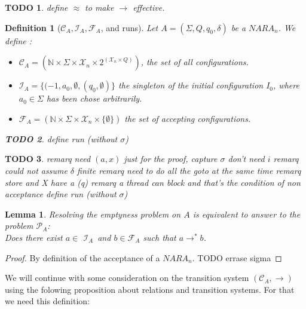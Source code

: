 \documentclass[a4paper,10pt]{report}
\newtheorem{lm}{Lemma}[thr]
\newtheorem{df}{Definition}
\newtheorem{td}{TODO}
\newcommand{\C}{\mathcal{C}_{A}}
\newcommand{\I}{\mathcal{I}_{A}}
\newcommand{\F}{\mathcal{F}_{A}}
\newcommand{\X}{\mathcal{X}_{n}}
\newcommand{\pb}{$\mathcal{P}_{A}$}
\begin{document}
\begin{td}
 define $\approx$ to make $\rightarrow$ effective.
\end{td}

\begin{df}[$\C,\I,\F$, and runs]
Let $A = (\Sigma ,Q ,q_0, \delta )$ be a $NARA_n$. We define :
\begin{itemize}
 \item $\C = (\mathbb N \times \Sigma \times \X \times 2^{(\X \times Q)})$, the set of all configurations.
 \item $\I = \{(-1,a_0,\emptyset,(q_0,\emptyset)\}$  the singleton of the initial configuration $I_0$, where $a_0 \in \Sigma$ has been chose arbitrarily.
 \item $\F = (\mathbb N \times \Sigma \times \X \times \{\emptyset\})$ the set of accepting configurations.
\end{itemize}


\begin{td}
  define run (without $\sigma$)

\end{td}


\end{df}



\begin{td}
remarq need $(a,x)$ just for the proof, capture $\sigma$ don't need $i$
remarq could not assume $\delta$ finite
remarq need to do all the goto at the same time
remarq store and X have a (q)
remarq a thread can block and that's the condition of non acceptance
define run (without $\sigma$)

\end{td}





\begin{lm}
  \label{lmtth}
  Resolving the emptyness problem on $A$ is equivalent to answer to the problem \pb: \\
  Does there exist $a \in$ $\I$\ and $b \in\F$ such that $ a \rightarrow^* b $. 
\end{lm}
\begin{proof} 
  By definition of the acceptance of a $NARA_n$. TODO errase sigma
\end{proof}
We will continue with some consideration on the transition system $(\C,\rightarrow)$ using the folowing proposition about relations and transition systems.
For that we need this definition:
\end{document}
